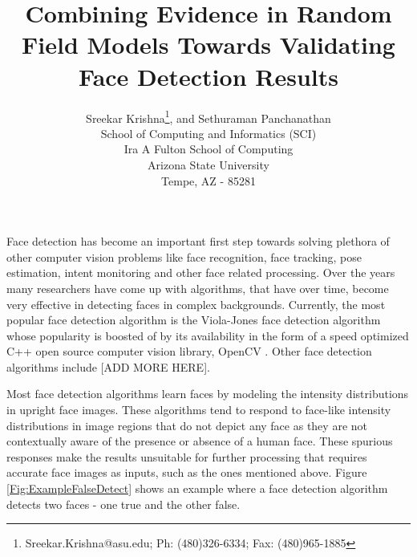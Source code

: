 \documentclass[times, 10pt,twocolumn]{article}
\begin{document}
\title{Combining Evidence in Random Field Models Towards Validating Face Detection Results}

\author{Sreekar Krishna\thanks{Sreekar.Krishna@asu.edu; Ph: (480)326-6334; Fax: (480)965-1885}, and Sethuraman Panchanathan\\
School of Computing and Informatics (SCI) \\ Ira A Fulton School of
Computing \\ Arizona State University \\ Tempe, AZ - 85281 }

\maketitle
\thispagestyle{empty}

\begin{abstract}

\end{abstract}

\label{Introduction} Face detection has become
an important first step towards solving plethora of other computer
vision problems like face recognition, face tracking, pose
estimation, intent monitoring and other face related processing.
Over the years many researchers have come up with algorithms, that
have over time, become very effective in detecting faces in complex
backgrounds. Currently, the most popular face detection algorithm is
the Viola-Jones \cite{viola_robust_2004} face detection algorithm
whose popularity is boosted of by its availability in the form of a
speed optimized C++ open source computer vision library, OpenCV
\cite{OpenCV}. Other face detection algorithms include
\cite{ming-hsuan_yang_detecting_2002} [ADD MORE HERE].

Most face detection algorithms learn faces by modeling the intensity
distributions in upright face images. These algorithms tend to
respond to face-like intensity distributions in image regions that
do not depict any face as they are not contextually aware of the
presence or absence of a human face. These spurious responses make
the results unsuitable for further processing that requires accurate
face images as inputs, such as the ones mentioned above. Figure
\ref{Fig:ExampleFalseDetect} shows an example where a face detection
algorithm detects two faces - one true and the other false.
\end{document}
